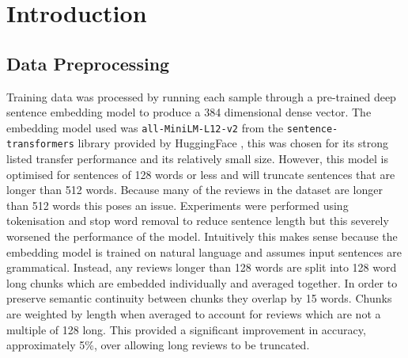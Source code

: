 \section{Introduction}


\subsection{Data Preprocessing}
Training data was processed by running each sample through a pre-trained deep sentence embedding model to produce a 384 dimensional dense vector. The embedding model used was \verb|all-MiniLM-L12-v2| \cite{HuggingFace} from the \verb|sentence-transformers| library provided by HuggingFace , this was chosen for its strong listed transfer performance and its relatively small size. However, this model is optimised for sentences of 128 words or less and will truncate sentences that are longer than 512 words. Because many of the reviews in the dataset are longer than 512 words this poses an issue. Experiments were performed using tokenisation and stop word removal to reduce sentence length but this severely worsened the performance of the model. Intuitively this makes sense because the embedding model is trained on natural language and assumes input sentences are grammatical. Instead, any reviews longer than 128 words are split into 128 word long chunks which are embedded individually and averaged together. In order to preserve semantic continuity between chunks they overlap by 15 words. Chunks are weighted by length when averaged to account for reviews which are not a multiple of 128 long. This provided a significant improvement in accuracy, approximately 5\%,  over allowing long reviews to be truncated.

